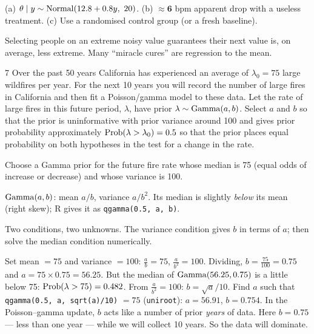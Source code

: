 \documentclass[11pt]{article}
\begin{document}
\begin{answer}
(a) $\theta\mid y\sim\mathrm{Normal}(12.8+0.8y,\ 20)$. \quad (b) $\approx\mathbf{6}$ bpm apparent drop with a useless treatment. \quad (c) Use a randomised control group (or a fresh baseline).
\end{answer}

\begin{takeaway}
Selecting people on an extreme noisy value guarantees their next value is, on average, less extreme. Many ``miracle cures'' are regression to the mean.
\end{takeaway}


\begin{problem}{7}
Over the past 50 years California has experienced an average of $\lambda_0=75$ large wildfires per year. For the next 10 years you will record the number of large fires in California and then fit a Poisson/gamma model to these data. Let the rate of large fires in this future period, $\lambda$, have prior $\lambda\sim\mathrm{Gamma}(a,b)$. Select $a$ and $b$ so that the prior is uninformative with prior variance around 100 and gives prior probability approximately $\mathrm{Prob}(\lambda>\lambda_0)=0.5$ so that the prior places equal probability on both hypotheses in the test for a change in the rate.
\end{problem}

\begin{restate}
Choose a Gamma prior for the future fire rate whose median is 75 (equal odds of increase or decrease) and whose variance is 100.
\end{restate}

\begin{recall}
$\mathrm{Gamma}(a,b)$: mean $a/b$, variance $a/b^2$. Its median is slightly \emph{below} its mean (right skew); R gives it as \texttt{qgamma(0.5, a, b)}.
\end{recall}

\begin{keyidea}
Two conditions, two unknowns. The variance condition gives $b$ in terms of $a$; then solve the median condition numerically.
\end{keyidea}

\solution
{}
Set mean $=75$ and variance $=100$: $\frac ab=75$, $\frac a{b^2}=100$. Dividing, $b=\frac{75}{100}=0.75$ and $a=75\times0.75=56.25$. But the median of $\mathrm{Gamma}(56.25,0.75)$ is a little below 75: $\mathrm{Prob}(\lambda>75)=0.482$.
From $\frac a{b^2}=100$: $b=\sqrt a/10$. Find $a$ such that \texttt{qgamma(0.5, a, sqrt(a)/10)} $=75$ (\texttt{uniroot}): $a=56.91$, $b=0.754$.
In the Poisson--gamma update, $b$ acts like a number of prior \emph{years} of data. Here $b=0.75$ --- less than one year --- while we will collect 10 years. So the data will dominate.
\end{document}
